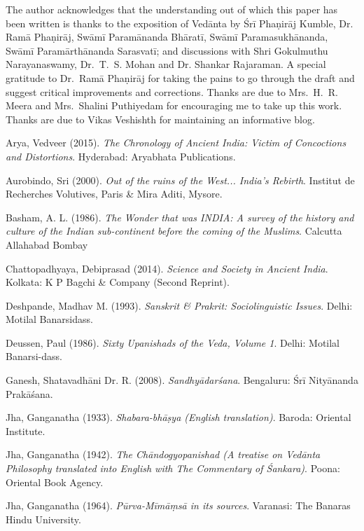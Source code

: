 The author acknowledges that the understanding out of which this paper has been written is thanks to the exposition of Vedānta by Śrī Phaṇirāj Kumble, Dr. Ramā Phaṇirāj, Swāmī Paramānanda Bhāratī, Swāmī Paramasukhānanda, Swāmī Paramārthānanda Sarasvatī; and discussions with Shri Gokulmuthu Narayanaswamy, Dr.~T.~S. Mohan and Dr. Shankar Rajaraman. A special gratitude to Dr.~Ramā Phaṇirāj for taking the pains to go through the draft and suggest critical improvements and corrections. Thanks are due to Mrs.~H.~R. Meera and Mrs.~Shalini Puthiyedam for encouraging me to take up this work. Thanks are due to Vikas Veshishth for maintaining an informative blog.

\begin{thebibliography}{99}
\itemsep=3pt
Arya, Vedveer (2015). {\sl The Chronology of Ancient India: Victim of Concoctions and Distortions}. Hyderabad: Aryabhata Publications.

Aurobindo, Sri (2000). {\sl Out of the ruins of the West... India’s Rebirth}. Institut de Recherches Volutives, Paris \& Mira Aditi, Mysore.

Basham, A. L. (1986). {\sl The Wonder that was INDIA: A survey of the history and culture of the Indian sub-continent before the coming of the Muslims}. Calcutta Allahabad Bombay

Chattopadhyaya, Debiprasad (2014). {\sl Science and Society in Ancient India}. Kolkata: K P Bagchi \& Company (Second Reprint).

Deshpande, Madhav M. (1993). {\sl Sanskrit \& Prakrit: Sociolinguistic Issues}. Delhi: Motilal Banarsidass.

Deussen, Paul (1986). {\sl Sixty Upanishads of the Veda, Volume 1}. Delhi: Motilal Banarsi-dass.

Ganesh, Shatavadhāni Dr. R. (2008). {\sl Sandhyādarśana}. Bengaluru: Śrī Nityānanda Prakāśana.

Jha, Ganganatha (1933). {\sl Shabara-bhāṣya (English translation)}. Baroda: Oriental Institute.

Jha, Ganganatha (1942). {\sl The Chāndogyopanishad (A treatise on Vedānta Philosophy translated into English with The Commentary of Śankara)}. Poona: Oriental Book Agency.

Jha, Ganganatha (1964). {\sl Pūrva-Mīmāṃsā in its sources}. Varanasi: The Banaras Hindu University.


\end{thebibliography}

